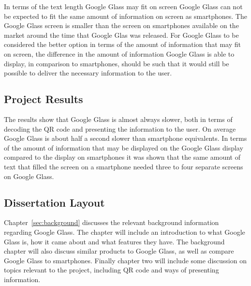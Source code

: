 
In terms of the text length Google Glass may fit on screen Google Glass can not be expected to fit the same amount of information on screen as smartphones. The Google Glass screen is smaller than the screen on smartphones available on the market around the time that Google Glas was released. For Google Glass to be considered the better option in terms of the amount of information that may fit on screen, the difference in the amount of information Google Glass is able to display, in comparison to smartphones, should be such that it would still be possible to deliver the necessary information to the user.

\subsection{Project Results}
The results show that Google Glass is almost always slower, both in terms of decoding the QR code and presenting the information to the user. On average Google Glass is about half a second slower than smartphone equivalents. In terms of the amount of information that may be displayed on the Google Glass display compared to the display on smartphones it was shown that the same amount of text that filled the screen on a smartphone needed three to four separate screens on Google Glass.

\subsection{Dissertation Layout}
Chapter~\ref{sec:background} discusses the relevant background information regarding Google Glass. The chapter will include an introduction to what Google Glass is, how it came about and what features they have. The background chapter will also discuss similar products to Google Glass, as well as compare Google Glass to smartphones. Finally chapter two will include some discussion on topics relevant to the project, including QR code and ways of presenting information.

